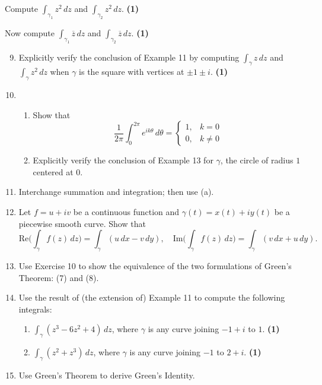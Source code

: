 \documentclass[12pt]{article}
\theoremstyle{definition} %
\theoremstyle{plain} %
\begin{document}
Compute $\displaystyle \int_{\gamma_1} z^2 \, dz$ and $\int_{\gamma_2} z^2 \, dz$. \quad \textbf{(1)}

Now compute $\displaystyle \int_{\gamma_1} \overline{z} \, dz$ and $\int_{\gamma_2} \overline{z} \, dz$. \quad \textbf{(1)}

\begin{enumerate}
    \setcounter{enumi}{8}
    \item Explicitly verify the conclusion of Example 11 by computing $\displaystyle \int_\gamma z \, dz$ and $\int_\gamma z^2 \, dz$ when $\gamma$ is the square with vertices at $\pm 1 \pm i$. \quad \textbf{(1)}
    \item 
    \begin{enumerate}
        \item Show that 
        \[
        \frac{1}{2\pi} \int_0^{2\pi} e^{i k \theta} \, d\theta = 
        \begin{cases}
        1, & k = 0 \\
        0, & k \ne 0
        \end{cases}
        \]
        \item Explicitly verify the conclusion of Example 13 for $\gamma$, the circle of radius $1$ centered at $0$. 
    \end{enumerate}
    \item Interchange summation and integration; then use (a).
    \item Let $f = u + iv$ be a continuous function and $\gamma(t) = x(t) + i y(t)$ be a piecewise smooth curve. Show that
    \[
    \text{Re} \biggl( \int_\gamma f(z) \, dz \biggr) = \int_\gamma (u \, dx - v \, dy),
    \quad
    \text{Im} \biggl( \int_\gamma f(z) \, dz \biggr) = \int_\gamma (v \, dx + u \, dy).
    \]
    \item Use Exercise 10 to show the equivalence of the two formulations of Green’s Theorem: (7) and (8).
    \item Use the result of (the extension of) Example 11 to compute the following integrals:
    \begin{enumerate}
        \item $\displaystyle \int_\gamma (z^3 - 6z^2 + 4) \, dz$, where $\gamma$ is any curve joining $-1 + i$ to $1$. \quad \textbf{(1)}
        \item $\displaystyle \int_\gamma (z^2 + z^3) \, dz$, where $\gamma$ is any curve joining $-1$ to $2 + i$. \quad \textbf{(1)}
    \end{enumerate}
    \item Use Green’s Theorem to derive Green’s Identity.

\end{enumerate}
\end{document}
